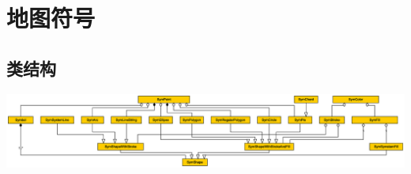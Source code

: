 \chapter{地图符号}

\section{类结构}

\newpage
\pdfpagewidth=420mm
\pdfpageheight=297mm

\thispagestyle{empty}

\begin{center}
	\includegraphics[width=35cm]{Symbol_extension/symbol_class_structure.eps}
\end{center}

